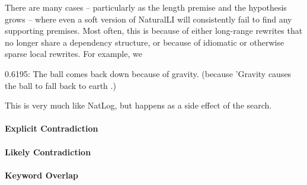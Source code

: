 There are many cases -- particularly as the length premise and the hypothesis grows --
  where even a soft version of NaturalLI will consistently fail to find any supporting
  premises.
Most often, this is because of either long-range rewrites that no longer share a
  dependency structure, or because of idiomatic or otherwise sparse local rewrites.
For example, we 

    0.6195: The ball comes back down because of gravity.  (because 'Gravity causes the ball to fall back to earth .)







This is very much like NatLog, but happens as a side effect of the search.


\paragraph{Explicit Contradiction}

\paragraph{Likely Contradiction}

\paragraph{Keyword Overlap}

